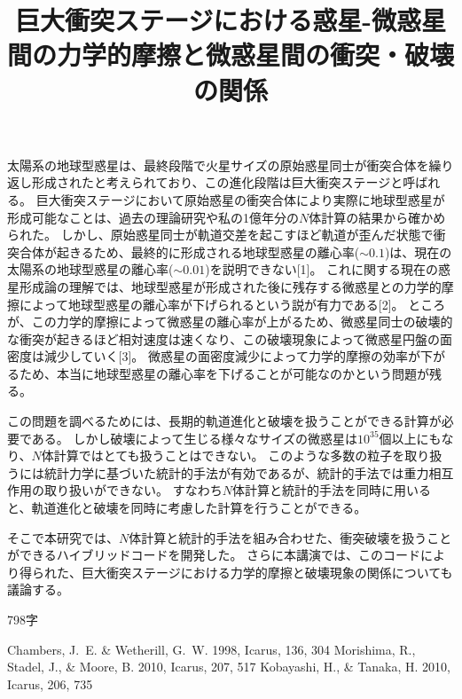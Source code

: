 \documentclass[11pt,a4paper]{jarticle}
\title{巨大衝突ステージにおける惑星-微惑星間の力学的摩擦と微惑星間の衝突・破壊の関係}
\begin{document}
\maketitle


太陽系の地球型惑星は、最終段階で火星サイズの原始惑星同士が衝突合体を繰り返し形成されたと考えられており、この進化段階は巨大衝突ステージと呼ばれる。
巨大衝突ステージにおいて原始惑星の衝突合体により実際に地球型惑星が形成可能なことは、過去の理論研究や私の1億年分の$N$体計算の結果から確かめられた。
しかし、原始惑星同士が軌道交差を起こすほど軌道が歪んだ状態で衝突合体が起きるため、最終的に形成される地球型惑星の離心率($\sim0.1$)は、現在の太陽系の地球型惑星の離心率($\sim0.01$)を説明できない[1]。
これに関する現在の惑星形成論の理解では、地球型惑星が形成された後に残存する微惑星との力学的摩擦によって地球型惑星の離心率が下げられるという説が有力である[2]。
ところが、この力学的摩擦によって微惑星の離心率が上がるため、微惑星同士の破壊的な衝突が起きるほど相対速度は速くなり、この破壊現象によって微惑星円盤の面密度は減少していく[3]。
微惑星の面密度減少によって力学的摩擦の効率が下がるため、本当に地球型惑星の離心率を下げることが可能なのかという問題が残る。
\par
この問題を調べるためには、長期的軌道進化と破壊を扱うことができる計算が必要である。
しかし破壊によって生じる様々なサイズの微惑星は$10^{35}$個以上にもなり、$N$体計算ではとても扱うことはできない。
このような多数の粒子を取り扱うには統計力学に基づいた統計的手法が有効であるが、統計的手法では重力相互作用の取り扱いができない。
すなわち$N$体計算と統計的手法を同時に用いると、軌道進化と破壊を同時に考慮した計算を行うことができる。
\par
そこで本研究では、$N$体計算と統計的手法を組み合わせた、衝突破壊を扱うことができるハイブリッドコードを開発した。
さらに本講演では、このコードにより得られた、巨大衝突ステージにおける力学的摩擦と破壊現象の関係についても議論する。
\par
798字
\par

\begin{thebibliography}{9}
  Chambers, J.~E. \& Wetherill, G.~W. 1998, Icarus, 136, 304
  Morishima, R., Stadel, J., \& Moore, B. 2010, Icarus, 207, 517
  Kobayashi, H., \& Tanaka, H. 2010, Icarus, 206, 735
\end{thebibliography}
\end{document}
